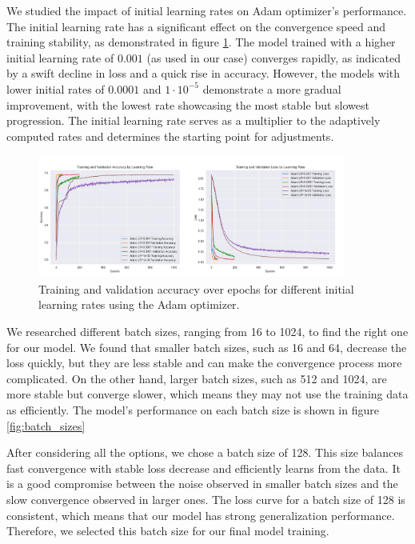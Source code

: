 We studied the impact of initial learning rates on Adam optimizer's performance. The initial learning rate has a significant effect on the convergence speed and training stability, as demonstrated in figure \ref{fig:learning_rates}.
The model trained with a higher initial learning rate of $0.001$ (as used in our case) converges rapidly, as indicated by a swift decline in loss and a quick rise in accuracy. However, the models with lower initial rates of $0.0001$ and $1\cdot10^{-5}$ demonstrate a more gradual improvement, with the lowest rate showcasing the most stable but slowest progression.
The initial learning rate serves as a multiplier to the adaptively computed rates and determines the starting point for adjustments.
\begin{figure}[ht!]
	\centering
	\includegraphics[width=0.9\textwidth]{images/adam_learning_rates_comparison.png}
	\caption{Training and validation accuracy over epochs for different initial learning rates using the Adam optimizer.}
	\label{fig:learning_rates}
\end{figure}

We researched different batch sizes, ranging from 16 to 1024, to find the right one for our model. We found that smaller batch sizes, such as 16 and 64, decrease the loss quickly, but they are less stable and can make the convergence process more complicated. On the other hand, larger batch sizes, such as 512 and 1024, are more stable but converge slower, which means they may not use the training data as efficiently. The model's performance on each batch size is shown in figure \ref{fig:batch_sizes}

After considering all the options, we chose a batch size of 128. This size balances fast convergence with stable loss decrease and efficiently learns from the data. It is a good compromise between the noise observed in smaller batch sizes and the slow convergence observed in larger ones. The loss curve for a batch size of 128 is consistent, which means that our model has strong generalization performance. Therefore, we selected this batch size for our final model training.


